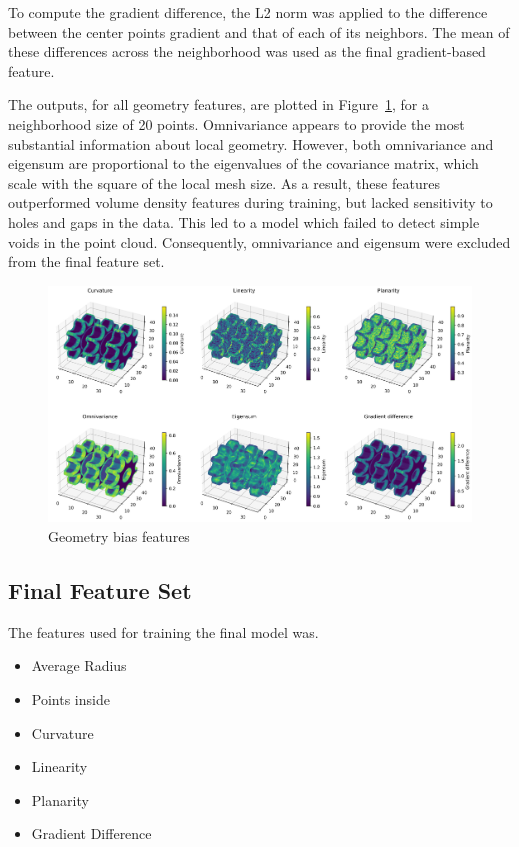 To compute the gradient difference, the L2 norm was applied to the difference between the center points gradient and that of each of its neighbors. The mean of these differences across the neighborhood was used as the final gradient-based feature.

The outputs, for all geometry features, are plotted in Figure~\ref{fig:feature_plot}, for a neighborhood size of 20 points. Omnivariance appears to provide the most substantial information about local geometry. However, both omnivariance and eigensum are proportional to the eigenvalues of the covariance matrix, which scale with the square of the local mesh size. As a result, these features outperformed volume density features during training, but lacked sensitivity to holes and gaps in the data. This led to a model which failed to detect simple voids in the point cloud. Consequently, omnivariance and eigensum were excluded from the final feature set.

\begin{figure}[h]
    \centering
    \includegraphics[width=\textwidth]{figures/feature_plots_lowQ.png}
    \caption{Geometry bias features}\label{fig:feature_plot}
\end{figure}

\subsection*{Final Feature Set}
The features used for training the final model was.
\begin{itemize}
    \item Average Radius
    \item Points inside
    \item Curvature
    \item Linearity
    \item Planarity
    \item Gradient Difference
\end{itemize}
\vspace{5pt}

